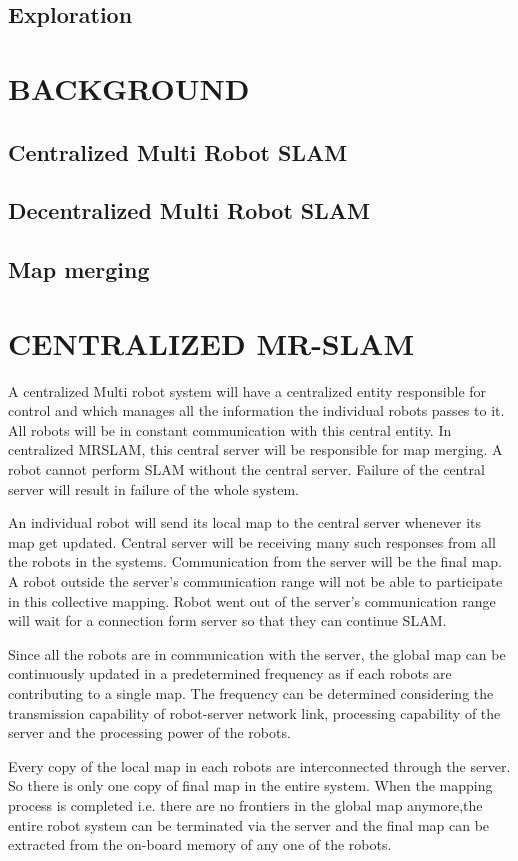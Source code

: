 \documentclass[MTech]{iitmdiss}
\begin{document}
\section{Exploration}


\chapter{BACKGROUND}
\section{Centralized Multi Robot SLAM}
\section{Decentralized Multi Robot SLAM}
\section{Map merging}

\chapter{CENTRALIZED MR-SLAM}
\label{chap:intro}
A centralized Multi robot system will have a centralized entity responsible for control and which manages all the information the individual robots passes to it. All robots will be in constant communication with this central entity. In centralized MRSLAM, this central server will be responsible for map merging. A robot cannot perform SLAM without the central server. Failure of the central server will result in failure of the whole system. \par
An individual robot will send its local map to the central server whenever its map get updated. Central server will be receiving many such responses from all the robots in the systems. Communication from the server will be the final map. A robot outside the server's communication range will not be able to participate in this collective mapping. Robot went out of the server's communication range will wait for a connection form server so that they can continue SLAM.\par
Since all the robots are in communication with the server, the global map can be continuously updated in a predetermined frequency as if each robots are contributing to a single map. The frequency can be determined considering the transmission capability of robot-server network link, processing capability of the server and the processing power of the robots.\par
Every copy of the local map in each robots are interconnected through the server. So there is only one copy of final map in the entire system. When the mapping process is completed i.e. there are no frontiers in the global map anymore,the entire robot system can be terminated via the server and the final map can be extracted from the on-board memory of any one of the robots.\par
\end{document}
